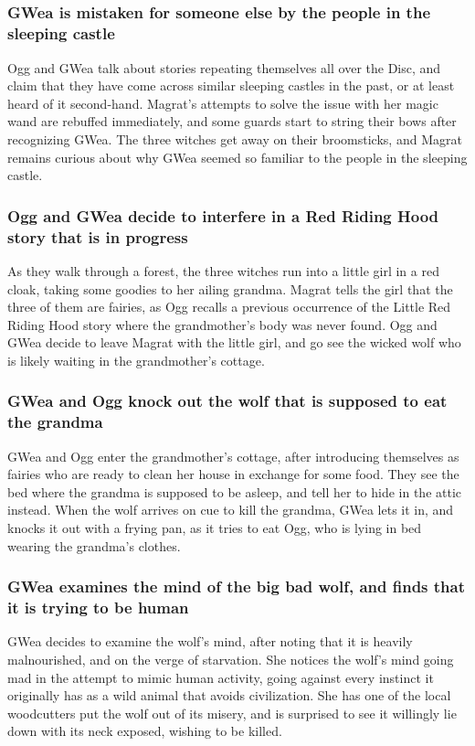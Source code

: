 \subsection{}
\subsubsection{\Gls{GWea} is mistaken for someone else by the people in the sleeping castle}
\Gls{Ogg} and \Gls{GWea} talk about stories repeating themselves all over the Disc, and claim that
they have come across similar sleeping castles in the past, or at least heard of it second-hand.
\Gls{Magrat}'s attempts to solve the issue with her magic wand are rebuffed immediately, and some
guards start to string their bows after recognizing \Gls{GWea}. The three witches get away on their
broomsticks, and \Gls{Magrat} remains curious about why \Gls{GWea} seemed so familiar to the people
in the sleeping castle.

\subsubsection{\Gls{Ogg} and \Gls{GWea} decide to interfere in a Red Riding Hood story that is in
    progress}
As they walk through a forest, the three witches run into a little girl in a red cloak, taking some
goodies to her ailing grandma. \Gls{Magrat} tells the girl that the three of them are fairies, as
\Gls{Ogg} recalls a previous occurrence of the Little Red Riding Hood story where the grandmother's
body was never found. \Gls{Ogg} and \Gls{GWea} decide to leave \Gls{Magrat} with the little girl,
and go see the wicked wolf who is likely waiting in the grandmother's cottage.

\subsubsection{\Gls{GWea} and \Gls{Ogg} knock out the wolf that is supposed to eat the grandma}
\Gls{GWea} and \Gls{Ogg} enter the grandmother's cottage, after introducing themselves as fairies
who are ready to clean her house in exchange for some food. They see the bed where the grandma is
supposed to be asleep, and tell her to hide in the attic instead. When the wolf arrives on cue to
kill the grandma, \Gls{GWea} lets it in, and knocks it out with a frying pan, as it tries to eat
\Gls{Ogg}, who is lying in bed wearing the grandma's clothes.

\subsubsection{\Gls{GWea} examines the mind of the big bad wolf, and finds that it is trying to be
    human}
\Gls{GWea} decides to examine the wolf's mind, after noting that it is heavily malnourished, and on
the verge of starvation. She notices the wolf's mind going mad in the attempt to mimic human
activity, going against every instinct it originally has as a wild animal that avoids civilization.
She has one of the local woodcutters put the wolf out of its misery, and is surprised to see it
willingly lie down with its neck exposed, wishing to be killed.

